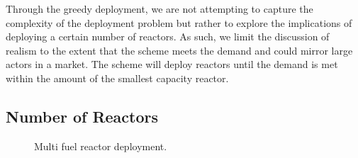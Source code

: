 Through the greedy deployment, we are not attempting to capture the complexity
of the deployment problem but rather to explore the implications of deploying a
certain number of reactors. As such, we limit the discussion of realism to the
extent that the scheme meets the demand and could mirror large actors in a
market. The scheme will deploy reactors until the demand is met within the
amount of the smallest capacity reactor.

\subsection{Number of Reactors}




\begin{figure}[H]
    \hfill
    \caption{Multi fuel reactor deployment.}
    \label{fig:greedy_mf_reactors}
\end{figure}




